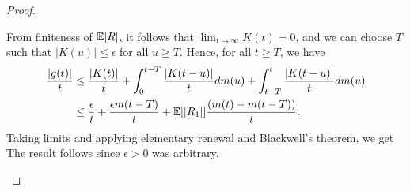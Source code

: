 \documentclass[a4paper,10pt,english]{article}
\begin{document}
\begin{proof}
\begin{enumerate}[(a)]
{}
From finiteness of $\mathbb{E}|R|$, 
it follows that $\lim_{t\to\infty}K(t) = 0$, and  we can choose $T$ such that $|K(u)| \leq \epsilon$ for all $ u \geq T$. 
Hence, for all $t \geq T$, we have
\begin{align*}
\frac{|g(t)|}{t} &\leq \frac{|K(t)|}{t} +\int_{0}^{t-T}\frac{|K(t-u)|}{t}dm(u)+\int_{t-T}^{t}\frac{|K(t-u)|}{t}dm(u)\\
&\leq \frac{\epsilon}{t}+ \frac{\epsilon m(t-T)}{t}+ \mathbb{E}[|R_1|]\frac{(m(t)-m(t-T))}{t}.
\end{align*}
Taking limits and applying elementary renewal and Blackwell's theorem, we get
The result follows since $\epsilon > 0$ was arbitrary.
%
\end{enumerate}
 \end{proof}
\end{document}
